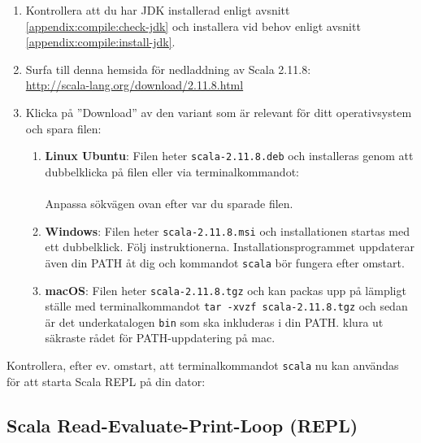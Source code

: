 \begin{enumerate}
\item Kontrollera att du har JDK installerad enligt avsnitt \ref{appendix:compile:check-jdk} och installera vid behov enligt avsnitt \ref{appendix:compile:install-jdk}.
\item Surfa till denna hemsida för nedladdning av Scala 2.11.8: \\ \url{http://scala-lang.org/download/2.11.8.html}
\item Klicka på ''Download'' av den variant som är relevant för ditt operativsystem och spara filen:

\begin{enumerate}
\item \textbf{Linux Ubuntu}: Filen heter \texttt{scala-2.11.8.deb} och installeras genom att dubbelklicka på filen eller via terminalkommandot:\\  \\ Anpassa sökvägen ovan efter var du sparade filen. 
\item \textbf{Windows}: Filen heter \texttt{scala-2.11.8.msi} och installationen startas med ett dubbelklick. Följ instruktionerna. Installationsprogrammet uppdaterar även din PATH åt dig och kommandot \texttt{scala} bör fungera efter omstart.
\item \textbf{macOS}: Filen heter \texttt{scala-2.11.8.tgz} och kan packas upp på lämpligt ställe med terminalkommandot \texttt{tar -xvzf scala-2.11.8.tgz} och sedan är det underkatalogen \texttt{bin} som ska inkluderas i din PATH. \TODO klura ut säkraste rådet för PATH-uppdatering på mac.
\end{enumerate}
\end{enumerate}
Kontrollera, efter ev. omstart, att terminalkommandot \texttt{scala} nu kan användas för att starta Scala REPL på din dator:
 

\subsection{Scala Read-Evaluate-Print-Loop (REPL)}\label{appendix:compile:REPL}

